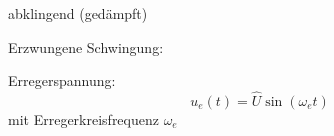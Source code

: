 \begin{frame}
{\begin{minipage}[c][4cm][c]{\textwidth}
\begin{minipage}[c][4cm][c]{0.35\textwidth}
        \quad abklingend (gedämpft)
    \end{minipage}
\end{minipage}

\noindent\begin{minipage}[c][4cm][c]{\textwidth}\centering%
    \begin{minipage}[c][4cm][c]{0.25\textwidth}\centering%
    \end{minipage}\hfill
    \begin{minipage}[c][4cm][c]{0.38\textwidth}\centering%
        Erzwungene Schwingung:\newline
    \end{minipage}\hfill%
    \begin{minipage}[c][4cm][c]{0.35\textwidth}%
        Erregerspannung:
        \begin{equation*}u_e(t) = \hat{U}\sin(\omega_e t)\end{equation*}
        \quad mit Erregerkreisfrequenz $\omega_e$
    \end{minipage}
\end{minipage}
}%
\end{frame}

